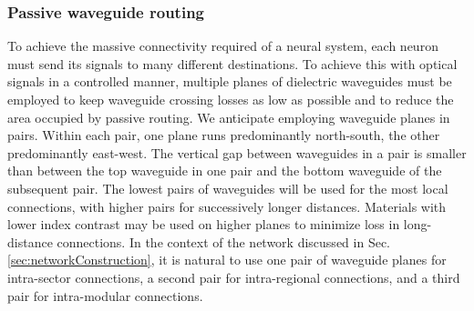\documentclass[twocolumn]{article}
\begin{document}
\subsubsection{Passive waveguide routing}
To achieve the massive connectivity required of a neural system, each neuron must send its signals to many different destinations. To achieve this with optical signals in a controlled manner, multiple planes of dielectric waveguides \cite{chbu2017,chbu2018,sami2017} must be employed to keep waveguide crossing losses as low as possible and to reduce the area occupied by passive routing. We anticipate employing waveguide planes in pairs. Within each pair, one plane runs predominantly north-south, the other predominantly east-west. The vertical gap between waveguides in a pair is smaller than between the top waveguide in one pair and the bottom waveguide of the subsequent pair. The lowest pairs of waveguides will be used for the most local connections, with higher pairs for successively longer distances. Materials with lower index contrast may be used on higher planes to minimize loss in long-distance connections. In the context of the network discussed in Sec.\,\ref{sec:networkConstruction}, it is natural to use one pair of waveguide planes for intra-sector connections, a second pair for intra-regional connections, and a third pair for intra-modular connections.
\end{document}
